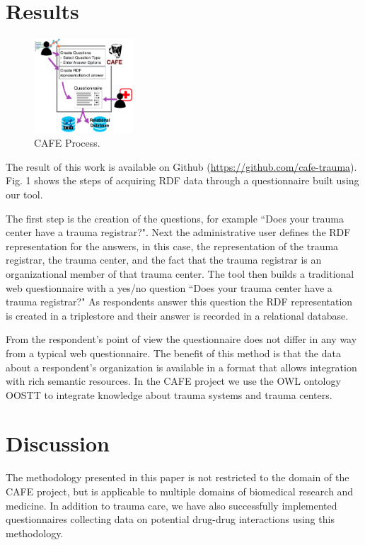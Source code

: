 \documentclass{amia}
\begin{document}
\section*{Results}
\begin{figure}
  \vspace{-10mm}
  \begin{center}
    \includegraphics[width=0.33\textwidth]{pics/cafe_process6.png}
  \end{center}
  \caption{CAFE Process.}
  \label{cafe_process}
\end{figure}

The result of this work is available on Github (\href{https://github.com/cafe-trauma}{https://github.com/cafe-trauma}).
Fig. 1 shows the steps of acquiring RDF data through a questionnaire built using our tool.

The first step is the creation of the questions, for example ``Does your trauma center have a trauma registrar?". 
Next the administrative user defines the RDF representation for the answers, in this case, the representation of the trauma registrar, the trauma center, and the fact that the trauma registrar is an organizational member of that trauma center.
The tool then builds a traditional web questionnaire with a yes/no question ``Does your trauma center have a trauma registrar?"
As respondents answer this question the RDF representation is created in a triplestore and their answer is recorded in a relational database.

From the respondent's point of view the questionnaire does not differ in any way from a typical web questionnaire.
The benefit of this method is that the data about a respondent's organization is available in a format that allows integration with rich semantic resources.
In the CAFE project we use the OWL ontology OOSTT \cite{ref3} to integrate knowledge about trauma systems and trauma centers.

\section*{Discussion}
The methodology presented in this paper is not restricted to the domain of the CAFE project, but is applicable to multiple domains of biomedical research and medicine.
In addition to trauma care, we have also successfully implemented questionnaires collecting data on potential drug-drug interactions using this methodology.
\end{document}
